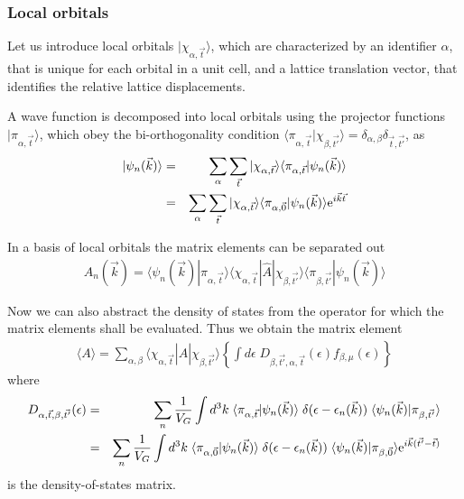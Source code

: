 \documentclass[11pt,a4paper]{report}
\begin{document}
\subsubsection{Local orbitals}
Let us introduce local orbitals $|\chi_{\alpha,\vec{t}}\rangle$, which
are characterized by an identifier $\alpha$, that is unique for each
orbital in a unit cell, and a lattice translation vector, that
identifies the relative lattice displacements.

A wave function is decomposed into local orbitals using the projector
functions $|\pi_{\alpha,\vec{t}}\rangle$, which obey the
bi-orthogonality condition
$\langle\pi_{\alpha,\vec{t}}|\chi_{\beta,\vec{t'}}\rangle=\delta_{\alpha,\beta}
\delta_{\vec{t},\vec{t'}}$, as
\begin{eqnarray}
|\psi_n(\vec{k})\rangle
&=&\sum_{\alpha}\sum_{\vec{t}}
|\chi_{\alpha,\vec{t}}\rangle
\langle\pi_{\alpha,\vec{t}}|\psi_n(\vec{k})\rangle
\nonumber\\
&=&\sum_{\alpha}\sum_{\vec{t}}
|\chi_{\alpha,\vec{t}}\rangle
\langle\pi_{\alpha,\vec{0}}|\psi_n(\vec{k})\rangle\mathrm{e}^{i\vec{k}\vec{t}}
\end{eqnarray}

In a basis of local orbitals the matrix elements can be separated out
\begin{eqnarray}
A_{n}(\vec{k})=\langle\psi_n(\vec{k})|\pi_{\alpha,\vec{t}}\rangle
\langle\chi_{\alpha,\vec{t}}|\hat{A}|\chi_{\beta,\vec{t'}}\rangle
\langle\pi_{\beta,\vec{t'}}|\psi_n(\vec{k})\rangle
\end{eqnarray}

Now we can also abstract the density of states from the operator for
which the matrix elements shall be evaluated.
Thus we obtain the matrix element
\begin{eqnarray}
\langle{A}\rangle=
\sum_{\alpha,\beta}\langle\chi_{\alpha,\vec{t}}|\hat{A}|\chi_{\beta,\vec{t'}}\rangle
\left\lbrace\int d\epsilon\; D_{\beta,\vec{t'},\alpha,\vec{t}}(\epsilon)
f_{\beta,\mu}(\epsilon)\right\rbrace
\end{eqnarray}
where
\begin{eqnarray}
D_{\alpha,\vec{t},\beta,\vec{t'}}(\epsilon)
&=&
\sum_n\frac{1}{V_G}\int d^3k\; 
\langle\pi_{\alpha,\vec{t}}|\psi_n(\vec{k})\rangle
\;\delta(\epsilon-\epsilon_n(\vec{k}))\;
\langle\psi_n(\vec{k})|\pi_{\beta,\vec{t'}}\rangle
\nonumber\\
&=&
\sum_n\frac{1}{V_G}\int d^3k\; 
\langle\pi_{\alpha,\vec{0}}|\psi_n(\vec{k})\rangle
\;\delta(\epsilon-\epsilon_n(\vec{k}))\;
\langle\psi_n(\vec{k})|\pi_{\beta,\vec{0}}\rangle\mathrm{e}^{i\vec{k}(\vec{t'}-\vec{t})}
\end{eqnarray}
is the density-of-states matrix.
\end{document}
